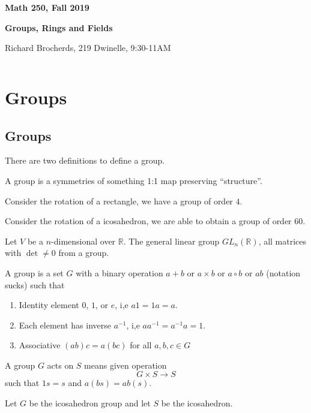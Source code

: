 \documentclass[12pt,letterpaper]{article}
\renewcommand{\b}{\mathbb}
\begin{document}
\thispagestyle{empty}
$ $
\vfill
\begin{center}

\centerline{\huge \textbf{Math 250, Fall 2019}}
\centerline{\Large \textbf{Groups, Rings and Fields}} 
\centerline{Richard Brocherds, 219 Dwinelle, 9:30-11AM}
\end{center}
\vfill
$ $
\newpage
\thispagestyle{empty}
\tableofcontents
\newpage
\setcounter{page}{1}
\section{Groups}
\subsection{Groups}
There are two definitions to define a group.
\begin{definition}
	A group is a symmetries of something 1:1 map preserving ``structure''.
\end{definition}
\begin{example}
	Consider the rotation of a rectangle, we have a group of order $4$.
\end{example}
\begin{example}
	Consider the rotation of a icosahedron, we are able to obtain a group of order $60$.
\end{example}
\begin{example}
	Let $V$ be a $n$-dimensional over $\b R$. The general linear group $GL_n(\b R)$, all matrices with $\det \neq 0$ from a group. 
\end{example}
\begin{definition}
	A group is a set $G$ with a binary operation $a + b$ or $a \times b$ or $a \circ b$ or $ab$ (notation sucks) such that
	\begin{enumerate}
		\item Identity element $0$, $1$, or $e$, i,e $a1 = 1a = a$.
		\item Each element has inverse $a^{-1}$, i,e $aa^{-1} = a^{-1}a = 1$.
		\item Associative $(ab)c = a(bc)$ for all $a,b,c \in G$
	\end{enumerate}
\end{definition}
\begin{definition}
	A group $G$ acts on $S$ means given operation 
	\[ G \times S \to S \]
	such that $1s = s$ and $a(bs) = ab(s)$.
\end{definition}
\begin{example}
	Let $G$ be the icosahedron group and let $S$ be the icosahedron.
\end{example}
\end{document}
